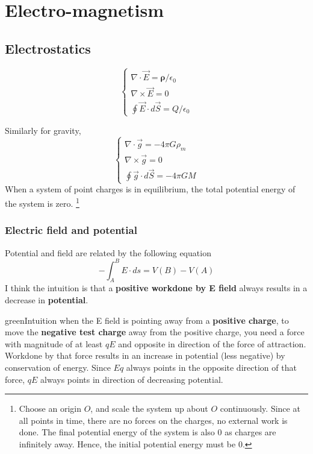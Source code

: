 \chapter{Electro-magnetism}

\section{Electrostatics}
\begin{equation}
    \begin{cases}
        \nabla \cdot \vec{E} = \mathbf{\rho}/\epsilon_0 \\
        \nabla \times \vec{E} = 0 \\
        \oint \vec{E} \cdot d\vec {S}=Q/\epsilon_0
      \end{cases}
\end{equation}

Similarly for gravity, 
\begin{equation}
    \begin{cases}
        \nabla \cdot \vec{g} = -4 \pi G \rho_m \\
        \nabla \times \vec{g} = 0 \\
        \oint \vec{g} \cdot d\vec {S}=-4\pi GM
    \end{cases}
\end{equation}
When a system of point charges is in equilibrium, the total potential energy of the system is zero. \footnote{Choose an origin $O$, and scale the system up about $O$ continuously. Since at all points in time, there are no forces on the charges, no external work is done. The final potential energy of the system is also 0 as charges are infinitely away. Hence, the initial potential energy must be 0.}


\subsection{Electric field and potential}
Potential and field are related by the following equation
\begin{equation}
    -\int_A^B E \cdot ds = V(B)-V(A)
\end{equation}
I think the intuition is that a \textbf{positive workdone by E field} always results in a decrease in \textbf{potential}.

\begin{mybox}{green}{Intuition}
    when the E field is pointing away from a \textbf{positive charge}, to move the \textbf{negative test charge} away from the positive charge, you need a force with magnitude of at least $qE$ and opposite in direction of the force of attraction. Workdone by that force results in an increase in potential (less negative) by conservation of energy. Since $Eq$ always points in the opposite direction of that force, $qE$ always points in direction of decreasing potential.
\end{mybox}

